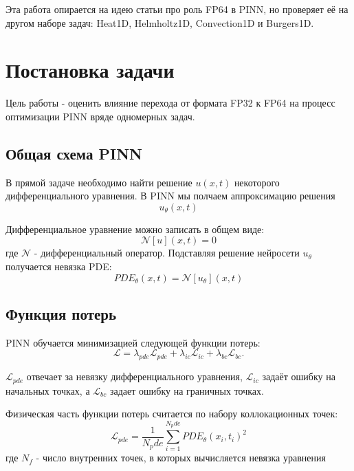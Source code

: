 \documentclass[14pt,a4paper]{extarticle}
\begin{document}
Эта работа опирается на идею статьи про роль FP64 в PINN, но проверяет её на другом наборе задач: Heat1D, Helmholtz1D, Convection1D и Burgers1D.



\section{Постановка задачи}

Цель работы - оценить влияние перехода от формата FP32 к FP64 на процесс оптимизации PINN вряде одномерных задач.

\subsection{Общая схема PINN}

В прямой задаче необходимо найти решение $u(x,t)$ некоторого дифференциального уравнения. В PINN мы полчаем аппроксимацию решения
\[
    u_\theta(x,t)
\]

Дифференциальное уравнение можно записать в общем виде:
\begin{equation}
    \mathcal{N}[u](x,t) = 0
    \label{eq:general_pde}
\end{equation}
где $\mathcal{N}$ - дифференциальный оператор. Подставляя решение нейросети $u_\theta$ получается невязка PDE:
\begin{equation}
    PDE_\theta(x,t) = \mathcal{N}[u_\theta](x,t)
    \label{eq:pde_residual}
\end{equation}

\subsection{Функция потерь}

PINN обучается минимизацией следующей функции потерь:
\begin{equation}
    \mathcal{L}
    =
    \lambda_{pde}\mathcal{L}_{pde}
    +
    \lambda_{ic}\mathcal{L}_{ic}
    +
    \lambda_{bc}\mathcal{L}_{bc}.
    \label{eq:pinn_loss}
\end{equation}

$\mathcal{L}_{pde}$ отвечает за невязку дифференциального уравнения, $\mathcal{L}_{ic}$ задаёт ошибку на начальных точках, а $\mathcal{L}_{bc}$ задает ошибку на граничных точках.

Физическая часть функции потерь считается по набору коллокационных точек:
\begin{equation}
    \mathcal{L}_{pde}
    =
    \frac{1}{N_pde}
    \sum_{i=1}^{N_pde}
    PDE_\theta(x_i,t_i)^2
    \label{eq:pde_loss}
\end{equation}
где $N_f$ - число внутренних точек, в которых вычисляется невязка уравнения
\end{document}
